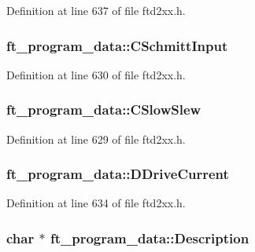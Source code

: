 Definition at line 637 of file ftd2xx.h.\hypertarget{structft__program__data_a7e78dd68e42bbbcff1000bcbce8a3d0d}{
\subsubsection[{CSchmittInput}]{ {\bf ft\_\-program\_\-data::CSchmittInput}}}
\label{structft__program__data_a7e78dd68e42bbbcff1000bcbce8a3d0d}


Definition at line 630 of file ftd2xx.h.\hypertarget{structft__program__data_a341949c5fa53d8f43deb3d37cba5a409}{
\subsubsection[{CSlowSlew}]{ {\bf ft\_\-program\_\-data::CSlowSlew}}}
\label{structft__program__data_a341949c5fa53d8f43deb3d37cba5a409}


Definition at line 629 of file ftd2xx.h.\hypertarget{structft__program__data_ae67162da23ce721b3ac18d019c255118}{
\subsubsection[{DDriveCurrent}]{ {\bf ft\_\-program\_\-data::DDriveCurrent}}}
\label{structft__program__data_ae67162da23ce721b3ac18d019c255118}


Definition at line 634 of file ftd2xx.h.\hypertarget{structft__program__data_a254c31fdadcc3ce3748f6682083874a8}{
\subsubsection[{Description}]{\setlength{\rightskip}{0pt plus 5cm}char $\ast$ {\bf ft\_\-program\_\-data::Description}}}
\label{structft__program__data_a254c31fdadcc3ce3748f6682083874a8}


